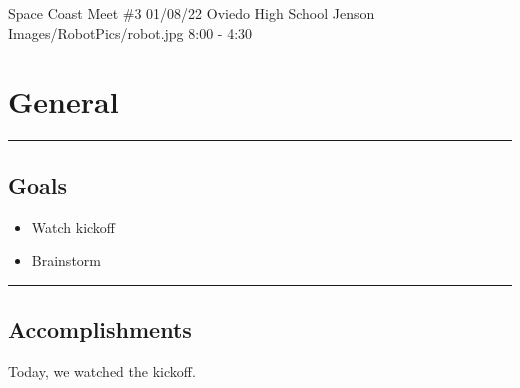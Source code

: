 \insertmeeting 
	{Space Coast Meet \#3} 
	{01/08/22}
	{Oviedo High School}
	{Jenson}
	{Images/RobotPics/robot.jpg}
	{8:00 - 4:30}
	
\section*{General}
\noindent\hfil\rule{\textwidth}{.4pt}\hfil
\subsection*{Goals}
\begin{itemize}
    \item Watch kickoff
    \item Brainstorm   

\end{itemize} 

\noindent\hfil\rule{\textwidth}{.4pt}\hfil

\subsection*{Accomplishments}
Today, we watched the kickoff.
 

